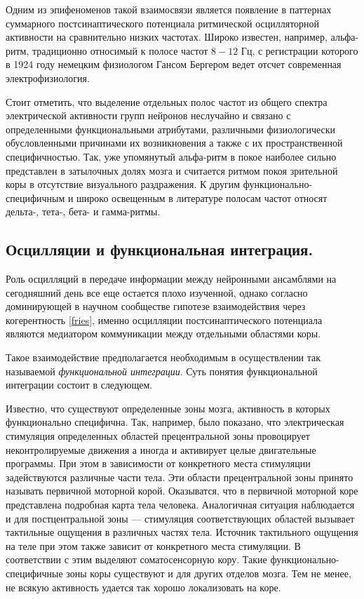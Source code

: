 Одним из эпифеноменов такой взаимосвязи является появление в паттернах
суммарного постсинаптического потенциала ритмической осцилляторной активности
на сравнительно низких частотах.  Широко известен, например, альфа-ритм,
традиционно относимый к полосе частот $8-12$ Гц, с регистрации которого в 1924
году немецким физиологом Гансом Бергером ведет отсчет современная
электрофизиология.

Стоит отметить, что выделение отдельных полос частот из общего спектра
электрической активности групп нейронов неслучайно и связано с определенными
функциональными атрибутами, различными физиологически обусловленными причинами
их возникновения а также с их пространственной специфичностью.  Так, уже
упомянутый альфа-ритм в покое наиболее сильно представлен в затылочных долях
мозга и считается ритмом покоя зрительной коры в отсутствие визуального
раздражения.  К другим функционально-специфичным и широко освещенным в
литературе полосам частот относят дельта-, тета-, бета- и гамма-ритмы.

\subsection{Осцилляции и функциональная интеграция.}
Роль осцилляций в передаче информации между нейронными ансамблями на
сегодняшний день все еще остается плохо изученной, однако согласно доминирующей
в научном сообществе гипотезе взаимодействия через когерентность \ref{fries},
именно осцилляции постсинаптического потенциала являются медиатором
коммуникации между отдельными областями коры.

Такое взаимодействие предполагается необходимым в осуществлении так называемой
\emph{функциональной интеграции}. Суть понятия функциональной интеграции
состоит в следующем.

Известно, что существуют определенные зоны мозга, активность в которых
функционально специфична.  Так, например, было показано, что электрическая
стимуляция определенных областей прецентральной зоны провоцирует
неконтролируемые движения а иногда и активирует целые двигательные программы.
При этом в зависимости от конкретного места стимуляции задействуются различные
части тела.  Эти области прецентральной зоны принято называть первичной
моторной корой.  Оказыватся, что в первичной моторной коре представлена
подробная карта тела человека.  Аналогичная ситуация наблюдается и для
постцентральной зоны --- стимуляция соответствующих областей вызывает
тактильные ощущения в различных частях тела. Источник тактильного ощущения на
теле при этом также зависит от конкретного места стимуляции. В соответствии с
этим выделяют соматосенсорную кору. Такие функционально-специфичные зоны коры
существуют и для других отделов мозга. Тем не менее, не всякую активность
удается так хорошо локализовать на коре.

